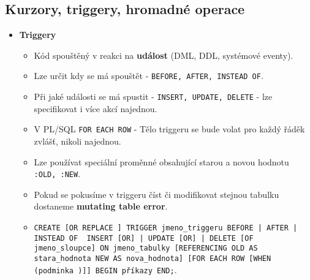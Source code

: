 \subsection{Kurzory, triggery, hromadné operace}
\begin{itemize}
    \item\textbf{Triggery}
          \begin{itemize}
              \item Kód spouštěný v reakci na \textbf{událost} (DML, DDL, systémové eventy).
              \item Lze určit kdy se má spouštět - \texttt{BEFORE, AFTER, INSTEAD OF}.
              \item Při jaké události se má spustit - \texttt{INSERT, UPDATE, DELETE} - lze specifikovat i více akcí najednou.
              \item V PL/SQL \texttt{FOR EACH ROW} - Tělo triggeru se bude volat pro každý řáděk zvlášť, nikoli najednou.
              \item Lze používat speciální proměnné obsahující starou a novou hodnotu \texttt{:OLD, :NEW}.
              \item Pokud se pokusíme v triggeru číst či modifikovat stejnou tabulku dostaneme \textbf{mutating table error}.
              \item \texttt{CREATE [OR REPLACE ] TRIGGER jmeno\_triggeru {BEFORE | AFTER | INSTEAD OF } {INSERT [OR] | UPDATE [OR] | DELETE} [OF jmeno\_sloupce] ON jmeno\_tabulky [REFERENCING OLD AS stara\_hodnota NEW AS nova\_hodnota] [FOR EACH ROW [WHEN (podminka )]] BEGIN příkazy END;}.
          \end{itemize}
\end{itemize}



